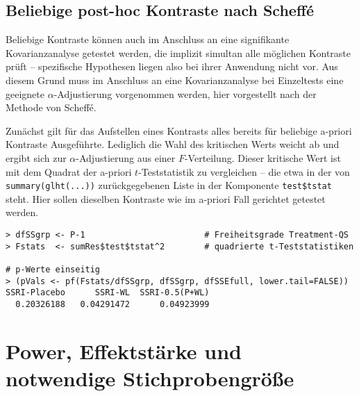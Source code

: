 \subsection{Beliebige post-hoc Kontraste nach Scheffé}

Beliebige Kontraste können auch im Anschluss an eine signifikante Kovarianzanalyse getestet werden, die implizit simultan alle möglichen Kontraste prüft -- spezifische Hypothesen liegen also bei ihrer Anwendung nicht vor. Aus diesem Grund muss im Anschluss an eine Kovarianzanalyse bei Einzeltests eine geeignete $\alpha$-Adjustierung vorgenommen werden, hier vorgestellt nach der Methode von Scheffé.

Zunächst gilt für das Aufstellen eines Kontrasts alles bereits für beliebige a-priori Kontraste Ausgeführte. Lediglich die Wahl des kritischen Werts weicht ab und ergibt sich zur $\alpha$-Adjustierung aus einer $F$-Verteilung. Dieser kritische Wert ist mit dem Quadrat der a-priori $t$-Teststatistik zu vergleichen -- die etwa in der von \lstinline!summary(glht(...))! zurückgegebenen Liste in der Komponente \lstinline!test$tstat! steht. Hier sollen dieselben Kontraste wie im a-priori Fall gerichtet getestet werden.
\begin{lstlisting}
> dfSSgrp <- P-1                        # Freiheitsgrade Treatment-QS
> Fstats  <- sumRes$test$tstat^2        # quadrierte t-Teststatistiken

# p-Werte einseitig
> (pVals <- pf(Fstats/dfSSgrp, dfSSgrp, dfSSEfull, lower.tail=FALSE))
SSRI-Placebo      SSRI-WL  SSRI-0.5(P+WL)
  0.20326188   0.04291472      0.04923999
\end{lstlisting}

\section{Power, Effektstärke und notwendige Stichprobengröße}
\label{sec:power}

